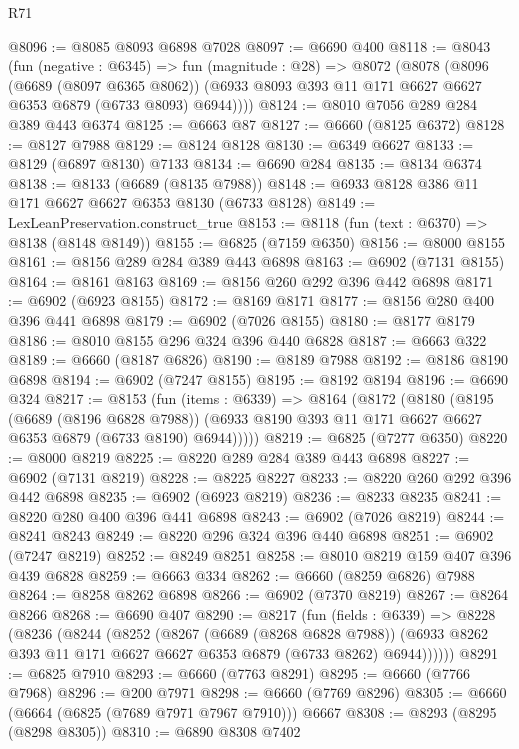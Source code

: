 \begin{lexlean}{R71}
\begin{coremodule}
@8096 := @8085 @8093 @6898 @7028
@8097 := @6690 @400
@8118 := @8043
    (fun (negative : @6345) =>
    fun (magnitude : @28) =>
    @8072
      (@8078
        (@8096
          (@6689 (@8097 @6365 @8062))
          (@6933 @8093 @393 @11 @171 @6627 @6627 @6353 @6879 (@6733 @8093) @6944))))
@8124 := @8010 @7056 @289 @284 @389 @443 @6374
@8125 := @6663 @87
@8127 := @6660 (@8125 @6372)
@8128 := @8127 @7988
@8129 := @8124 @8128
@8130 := @6349 @6627
@8133 := @8129 (@6897 @8130) @7133
@8134 := @6690 @284
@8135 := @8134 @6374
@8138 := @8133 (@6689 (@8135 @7988))
@8148 := @6933 @8128 @386 @11 @171 @6627 @6627 @6353 @8130 (@6733 @8128)
@8149 := LexLeanPreservation.construct_true
@8153 := @8118 (fun (text : @6370) => @8138 (@8148 @8149))
@8155 := @6825 (@7159 @6350)
@8156 := @8000 @8155
@8161 := @8156 @289 @284 @389 @443 @6898
@8163 := @6902 (@7131 @8155)
@8164 := @8161 @8163
@8169 := @8156 @260 @292 @396 @442 @6898
@8171 := @6902 (@6923 @8155)
@8172 := @8169 @8171
@8177 := @8156 @280 @400 @396 @441 @6898
@8179 := @6902 (@7026 @8155)
@8180 := @8177 @8179
@8186 := @8010 @8155 @296 @324 @396 @440 @6828
@8187 := @6663 @322
@8189 := @6660 (@8187 @6826)
@8190 := @8189 @7988
@8192 := @8186 @8190 @6898
@8194 := @6902 (@7247 @8155)
@8195 := @8192 @8194
@8196 := @6690 @324
@8217 := @8153
    (fun (items : @6339) =>
    @8164
      (@8172
        (@8180
          (@8195
            (@6689 (@8196 @6828 @7988))
            (@6933 @8190 @393 @11 @171 @6627 @6627 @6353 @6879 (@6733 @8190) @6944)))))
@8219 := @6825 (@7277 @6350)
@8220 := @8000 @8219
@8225 := @8220 @289 @284 @389 @443 @6898
@8227 := @6902 (@7131 @8219)
@8228 := @8225 @8227
@8233 := @8220 @260 @292 @396 @442 @6898
@8235 := @6902 (@6923 @8219)
@8236 := @8233 @8235
@8241 := @8220 @280 @400 @396 @441 @6898
@8243 := @6902 (@7026 @8219)
@8244 := @8241 @8243
@8249 := @8220 @296 @324 @396 @440 @6898
@8251 := @6902 (@7247 @8219)
@8252 := @8249 @8251
@8258 := @8010 @8219 @159 @407 @396 @439 @6828
@8259 := @6663 @334
@8262 := @6660 (@8259 @6826) @7988
@8264 := @8258 @8262 @6898
@8266 := @6902 (@7370 @8219)
@8267 := @8264 @8266
@8268 := @6690 @407
@8290 := @8217
    (fun (fields : @6339) =>
    @8228
      (@8236
        (@8244
          (@8252
            (@8267
              (@6689 (@8268 @6828 @7988))
              (@6933 @8262 @393 @11 @171 @6627 @6627 @6353 @6879 (@6733 @8262) @6944))))))
@8291 := @6825 @7910
@8293 := @6660 (@7763 @8291)
@8295 := @6660 (@7766 @7968)
@8296 := @200 @7971
@8298 := @6660 (@7769 @8296)
@8305 := @6660 (@6664 (@6825 (@7689 @7971 @7967 @7910))) @6667
@8308 := @8293 (@8295 (@8298 @8305))
@8310 := @6890 @8308 @7402

\end{coremodule}
\end{lexlean}
